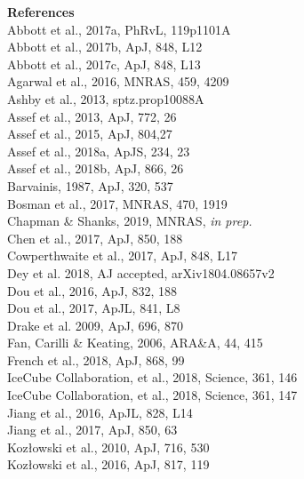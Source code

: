 \documentclass[12pt]{article}
\begin{document}
\pagebreak
\noindent
\textbf{References} \\
Abbott et al., 2017a,  PhRvL, 119p1101A	\\
Abbott et al., 2017b, ApJ, 848, L12	\\
Abbott et al., 2017c, ApJ, 848, L13	\\
Agarwal et al., 2016,  MNRAS, 459, 4209 \\
Ashby et al., 2013, sptz.prop10088A \\
Assef et al., 2013, ApJ, 772, 26      \\       %
Assef et al., 2015,  ApJ, 804,27 \\            %
Assef et al., 2018a,  ApJS, 234, 23	\\     %
Assef et al., 2018b, ApJ, 866, 26 \\          %
Barvainis, 1987, ApJ, 320, 537 \\
Bosman et al., 2017, MNRAS, 470, 1919 \\
Chapman \& Shanks, 2019, MNRAS, {\it in prep.} \\
Chen et al., 2017, ApJ, 850, 188 \\
Cowperthwaite et al., 2017,  ApJ, 848, L17	\\
Dey et al. 2018, AJ accepted, arXiv1804.08657v2 \\
Dou et al., 2016, ApJ, 832, 188 \\ 
Dou et al., 2017, ApJL, 841, L8 \\
Drake et al. 2009, ApJ, 696, 870 \\
Fan, Carilli \& Keating, 2006, ARA\&A, 44, 415 \\
French et al., 2018, ApJ, 868, 99 \\
IceCube Collaboration, et al., 2018, Science, 361, 146 \\ 
IceCube Collaboration, et al., 2018, Science, 361, 147 \\
Jiang et al., 2016, ApJL, 828, L14 \\
Jiang et al., 2017, ApJ, 850, 63  \\
Koz{\l}owski et al., 2010, ApJ, 716, 530 \\  
Koz{\l}owski et al., 2016, ApJ, 817, 119 \\
\end{document}
